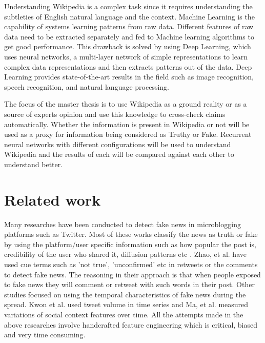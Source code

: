 \documentclass[a4paper, 11pt]{article}
\begin{document}
Understanding Wikipedia is a complex task since it requires understanding the subtleties of English natural language and the context. Machine Learning is the capability of systems learning patterns from raw data. Different features of raw data need to be extracted separately and fed to Machine learning algorithms to get good performance. This drawback is solved by using Deep Learning, which uses neural networks, a multi-layer network of simple representations to learn complex data representations and then extracts patterns out of the data\cite{Goodfellow2016}. Deep Learning provides state-of-the-art results in the field such as image recognition, speech recognition, and natural language processing.

The focus of the master thesis is to use Wikipedia as a ground reality or as a source of experts opinion and use this knowledge to cross-check claims automatically. Whether the information is present in Wikipedia or not will be used as a proxy for information being considered as Truthy or Fake. Recurrent neural networks with different configurations will be used to understand Wikipedia and the results of each will be compared against each other to understand better.

\section{Related work}


Many researches have been conducted to detect fake news in microblogging platforms such as Twitter. Most of these works classify the news as truth or fake by using the platform/user specific information such as how popular the post is, credibility of the user who shared it, diffusion patterns etc \cite{Liu2015} \cite{Ma2015}. Zhao, et al. \cite{Zhao2015} have used cue terms such as 'not true', 'unconfirmed' etc in retweets or the comments to detect fake news. The reasoning in their approach is that when people exposed to fake news they will comment or retweet with such words in their post. Other studies focused on using the temporal characteristics of fake news during the spread. Kwon et al.\cite{Kwon2013} used tweet volume in time series and Ma, et al.\cite{Ma2015} measured variations of social context features over time. All the attempts made in the above researches involve handcrafted feature engineering which is critical, biased and very time consuming.
\end{document}
